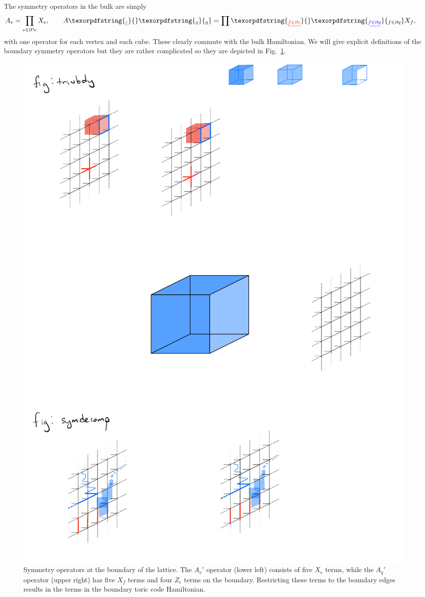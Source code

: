 \documentclass[twocolumn, longbibliography]{revtex4-2}
\newcommand{\pardag}{\partial^\dagger\!}
\providecommand{\DIFaddtex}[1]{{\protect\color{blue}\uwave{#1}}} %
\providecommand{\DIFdeltex}[1]{{\protect\color{red}\sout{#1}}}                      %
\providecommand{\DIFaddbegin}{} %
\providecommand{\DIFaddend}{} %
\providecommand{\DIFdelbegin}{} %
\providecommand{\DIFdelend}{} %
\providecommand{\DIFadd}[1]{\texorpdfstring{\DIFaddtex{#1}}{#1}} %
\providecommand{\DIFdel}[1]{\texorpdfstring{\DIFdeltex{#1}}{}} %
\newcommand{\DIFscaledelfig}{0.5}
\newlength{\DIFdelgraphicswidth} %
\newlength{\DIFdelgraphicsheight} %
\newcommand{\DIFaddincludegraphics}[2][]{{\color{blue}\fbox{\DIFOincludegraphics[#1]{#2}}}} %
\newcommand{\DIFdelincludegraphics}[2][]{%
\sbox{\DIFdelgraphicsbox}{\DIFOincludegraphics[#1]{#2}}%
\settoboxwidth{\DIFdelgraphicswidth}{\DIFdelgraphicsbox} %
\settoboxtotalheight{\DIFdelgraphicsheight}{\DIFdelgraphicsbox} %
\scalebox{\DIFscaledelfig}{%
\parbox[b]{\DIFdelgraphicswidth}{\usebox{\DIFdelgraphicsbox}\\[-\baselineskip] \rule{\DIFdelgraphicswidth}{0em}}\llap{\resizebox{\DIFdelgraphicswidth}{\DIFdelgraphicsheight}{%
\setlength{\unitlength}{\DIFdelgraphicswidth}%
\begin{picture}(1,1)%
\thicklines\linethickness{2pt} %
{\color[rgb]{1,0,0}\put(0,0){\framebox(1,1){}}}%
{\color[rgb]{1,0,0}\put(0,0){\line( 1,1){1}}}%
{\color[rgb]{1,0,0}\put(0,1){\line(1,-1){1}}}%
\end{picture}%
}\hspace*{3pt}}} %
} %
\DeclareRobustCommand{\DIFaddbegin}{\DIFOaddbegin \let\includegraphics\DIFaddincludegraphics} %
\DeclareRobustCommand{\DIFaddend}{\DIFOaddend \let\includegraphics\DIFOincludegraphics} %
\DeclareRobustCommand{\DIFdelbegin}{\DIFOdelbegin \let\includegraphics\DIFdelincludegraphics} %
\DeclareRobustCommand{\DIFdelend}{\DIFOaddend \let\includegraphics\DIFOincludegraphics} %
\begin{document}
The symmetry operators in the bulk are simply 
\begin{align}
A_v &= \prod_{e\in\pardag v} X_e,\qquad A\DIFdelbegin \DIFdel{_c }\DIFdelend \DIFaddbegin \DIFadd{_q }\DIFaddend = \prod\DIFdelbegin \DIFdel{_{f\in \partial c}}\DIFdelend \DIFaddbegin \DIFadd{_{f\in \partial q}}\DIFaddend X_f,
\end{align}
with one operator for each vertex and each cube. These clearly commute with the bulk Hamiltonian. We will give explicit definitions of the boundary symmetry operators but they are rather complicated so they are depicted  in Fig.~\ref{fig:trivbdy}.

\begin{figure}
\centering
\includegraphics{trivbdy}
\caption{Symmetry operators at the boundary of the lattice. The $A_v'$ operator (lower left) consists of five $X_e$ terms, while the $A_q'$ operator (upper right) has five $X_f$ terms and four $Z_e$ terms on the boundary. Restricting these terms to the boundary edges results in the terms in the boundary toric code Hamiltonian.}
\label{fig:trivbdy}
\end{figure}
\end{document}
